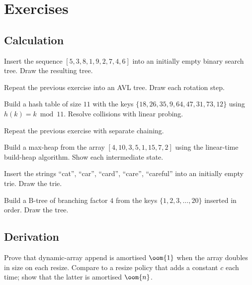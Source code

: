\section{Exercises}

\subsection*{Calculation}

\begin{exercise}
Insert the sequence $[5, 3, 8, 1, 9, 2, 7, 4, 6]$ into an initially empty binary search tree. Draw the resulting tree.
\end{exercise}

\begin{exercise}
Repeat the previous exercise into an AVL tree. Draw each rotation step.
\end{exercise}

\begin{exercise}
Build a hash table of size $11$ with the keys $\{18, 26, 35, 9, 64, 47, 31, 73, 12\}$ using $h(k) = k \bmod 11$. Resolve collisions with linear probing.
\end{exercise}

\begin{exercise}
Repeat the previous exercise with separate chaining.
\end{exercise}

\begin{exercise}
Build a max-heap from the array $[4, 10, 3, 5, 1, 15, 7, 2]$ using the linear-time build-heap algorithm. Show each intermediate state.
\end{exercise}

\begin{exercise}
Insert the strings ``cat'', ``car'', ``card'', ``care'', ``careful'' into an initially empty trie. Draw the trie.
\end{exercise}

\begin{exercise}
Build a B-tree of branching factor $4$ from the keys $\{1, 2, 3, \ldots, 20\}$ inserted in order. Draw the tree.
\end{exercise}

\subsection*{Derivation}

\begin{exercise}
Prove that dynamic-array append is amortised $\oom{1}$ when the array doubles in size on each resize. Compare to a resize policy that adds a constant $c$ each time; show that the latter is amortised $\oom{n}$.
\end{exercise}

